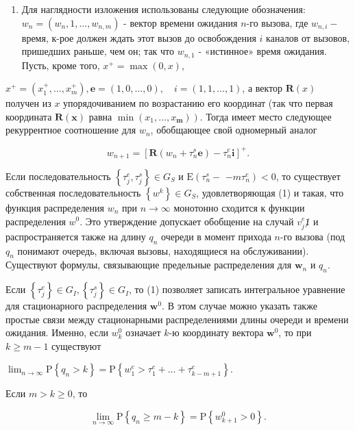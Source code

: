 \documentclass[10pt]{article}
\begin{document}
\begin{enumerate}

  \item Для наглядности изложения использованы следующие обозначения: $w_{n}=\left(w_{n}, 1, \ldots, w_{n, m}\right)$ - вектор времени ожидания $n$-го вызова, где $w_{n, i}-$ время, к-рое должен ждать этот вызов до освобождения $i$ каналов от вызовов, пришедших раньше, чем он; так что $w_{n, 1}$ - «истинное» время ожидания. Пусть, кроме того, $x^{+}=\max (0, x)$,

\end{enumerate}



$x^{+}=\left(x_{1}^{+}, \ldots, x_{m}^{+}\right), \boldsymbol{e}=(1,0, \ldots, 0), \quad i=(1,1, \ldots, 1)$, а вектор $\boldsymbol{R}(x)$ получен из $x$ упорядочиванием по возрастанию его координат (так что первая координата $\boldsymbol{R}(\boldsymbol{x})$ равна $\left.\min \left(x_{1}, \ldots, x_{\boldsymbol{m}}\right)\right)$. Тогда имеет место следующее рекуррентное соотношение для $w_{n}$, обобщающее свой одномерный аналог



\[

w_{n+1}=\left[\boldsymbol{R}\left(w_{n}+\tau_{n}^{s} \boldsymbol{e}\right)-\tau_{n}^{e} \boldsymbol{i}\right]^{+} .

\]



Если последовательность $\left\{\tau_{j}^{e}, \tau_{j}^{s}\right\} \in G_{S}$ и $\mathrm{E}\left(\tau_{n}^{s}-\right.$ $\left.-m \tau_{n}^{e}\right)<0$, то существует собственная последовательность $\left\{w^{k}\right\} \in G_{S}$, удовлетворяющая (1) и такая, что функция распределения $w_{n}$ при $n \rightarrow \infty$ монотонно сходится к функции распределения $w^{0}$. Это утверждение допускает обобщение на случай $v_{j}^{e} \not 1$ и распространяется также на длину $q_{n}$ очереди в момент прихода $n$-го вызова (под $q_{n}$ понимают очередь, включая вызовы, находящиеся на обслуживании). Существуют формулы, связывающие предельные распределения для $\boldsymbol{w}_{n}$ и $q_{n}$.



Если $\left\{\tau_{j}^{e}\right\} \in G_{I},\left\{\tau_{j}^{s}\right\} \in G_{I}$, то (1) позволяет записать интегральное уравнение для стационарного распределения $\boldsymbol{w}^{0}$. В этом случае можно указать также простые связи между стационарными распределениями длины очереди и времени ожидания. Именно, если $w_{k}^{0}$ означает $k$-ю координату вектора $\boldsymbol{w}^{0}$, то при $k \geqslant m-1$ существуют



$\lim _{n \rightarrow \infty} \mathrm{P}\left\{q_{n}>k\right\}=\mathrm{P}\left\{w_{1}^{e}>\tau_{1}^{e}+\ldots+\tau_{k-m+1}^{e}\right\}$.



Если $m>k \geqslant 0$, то



\[

\lim _{n \rightarrow \infty} \mathrm{P}\left\{q_{n} \geqslant m-k\right\}=\mathrm{P}\left\{w_{k+1}^{0}>0\right\} .

\]
\end{document}
